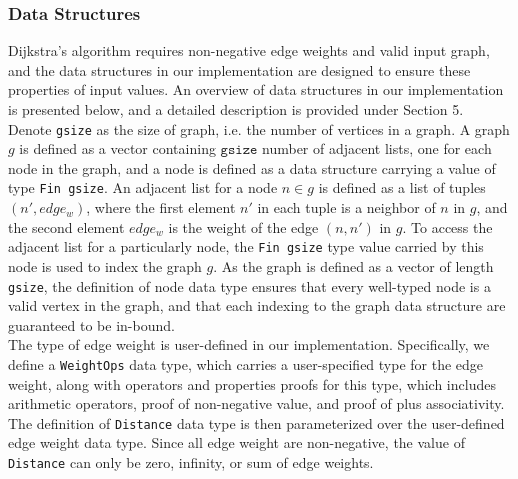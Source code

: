 \subsubsection{Data Structures}
Dijkstra's algorithm requires non-negative edge weights and valid input graph, and the data structures in our implementation are designed to ensure these properties of input values. An overview of data structures in our implementation is presented below, and a detailed description is provided under Section 5. 
\\
Denote \texttt{gsize} as the size of graph, i.e. the number of vertices in a graph. A graph $g$ is defined as a vector containing $\texttt{gsize}$ number of adjacent lists, one for each node in the graph, and a node is defined as a data structure carrying a value of type \texttt{Fin gsize}. An adjacent list for a node $n \in g$ is defined as a list of tuples $(n', edge_w)$, where the first element $n'$ in each tuple is a neighbor of $n$ in $g$, and the second element $edge_w$ is the weight of the edge $(n, n')$ in $g$. To access the adjacent list for a particularly node, the \texttt{Fin gsize} type value carried by this node is used to index the graph $g$. As the graph is defined as a vector of length \texttt{gsize}, the definition of node data type ensures that every well-typed node is a valid vertex in the graph, and that each indexing to the graph data structure are guaranteed to be in-bound.
\\
The type of edge weight is user-defined in our implementation. Specifically, we define a \texttt{WeightOps} data type, which carries a user-specified type for the edge weight, along with operators and properties proofs for this type, which includes arithmetic operators, proof of non-negative value, and proof of plus associativity. The definition of \texttt{Distance} data type is then parameterized over the user-defined edge weight data type. Since all edge weight are non-negative, the value of \texttt{Distance} can only be zero, infinity, or sum of edge weights. 


